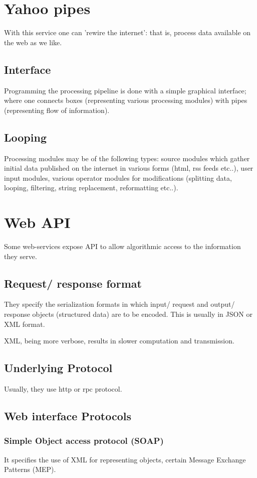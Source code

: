 \chapter{Yahoo pipes}
With this service one can 'rewire the internet': that is, process data available on the web as we like.

\section{Interface}
Programming the processing pipeline is done with a simple graphical interface; where one connects boxes (representing various processing modules) with pipes (representing flow of information).

\section{Looping}
Processing modules may be of the following types: source modules which gather initial data published on the internet in various forms (html, rss feeds etc..),  user input modules, various operator modules for modifications (splitting data, looping, filtering, string replacement, reformatting etc..).

\chapter{Web API}
Some web-services expose API to allow algorithmic access to the information they serve.

\section{Request/ response format}
They specify the serialization formats in which input/ request and output/ response objects (structured data) are to be encoded. This is usually in JSON or XML format.

XML, being more verbose, results in slower computation and transmission.

\section{Underlying Protocol}
Usually, they use http or rpc protocol.

\section{Web interface Protocols}
\subsection{Simple Object access protocol (SOAP)}
It specifies the use of XML for representing objects, certain Message Exchange Patterns (MEP).

